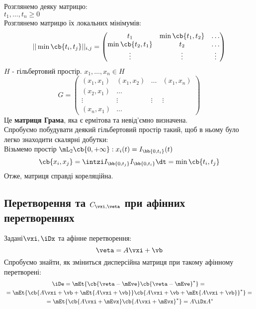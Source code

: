 \begin{exs}
Розглянемо деяку матрицю: \\
$t_1,\ldots,t_n\geq0$\\
Розглянемо матрицю їх локальних мінімумів:
\begin{equation*}
||\min\cb{t_i,t_j}||_{i,j} = \begin{pmatrix}
t_1 & \min\cb{t_1,t_2} & \ldots \\
\min\cb{t_2,t_1} & t_2 & \ldots \\
\vdots &\vdots & \vdots
\end{pmatrix}
\end{equation*}
$H$ - гільбертовий простір. $x_1,\ldots,x_n\in H$
\begin{equation*}
G = \begin{pmatrix}
(x_1,x_1) & (x_1,x_2) & \ldots & (x_1,x_n) \\
(x_2,x_1) & \ldots\\
\vdots & \vdots & \vdots & \vdots \\
(x_n,x_1) & \ldots
\end{pmatrix}
\end{equation*}
Це \textbf{матриця Грама}, яка є ермітова та невід’ємно визначена.\\
Спробуємо побудувати деякий гільбертовий простір такий, щоб в ньому було легко знаходити скалярні добутки:\\
Візьмемо простір $\mL_2\cb{0,+\infty}:x_i(t) = I_{\bb{0,t_i}}(t)$
\begin{equation*}
\cb{x_i,x_j} = \intzi I_{\bb{0,t_j}} I_{\bb{0,t_i}} \dt = \min\cb{t_i,t_j}
\end{equation*}
Отже, матриця справді кореляційна.
\end{exs}
\subsection{Перетворення \iDx та $C_{\vxi,\veta}$ при афінних перетвореннях}
Задані$\vxi,\iDx$ та афінне перетворення:
\begin{equation}
\veta = A\vxi + \vb
\end{equation}
Спробуємо знайти, як зміниться дисперсійна матриця при такому афінному перетворені:
\begin{multline}
\iDe = \mEt{\cb{\veta-\mEve}\cb{\veta-\mEve}^\ast} ={}\\{}= \mEt{\cb{A\vxi + \vb+\mEt{A\vxi + \vb}}\cb{A\vxi + \vb+\mEt{A\vxi + \vb}}^\ast} ={}\\{}= \mEt{\cb{A\vxi+\mEvx}\cb{A\vxi+\mEvx}^\ast} = A\iDx A^\ast
\end{multline}
